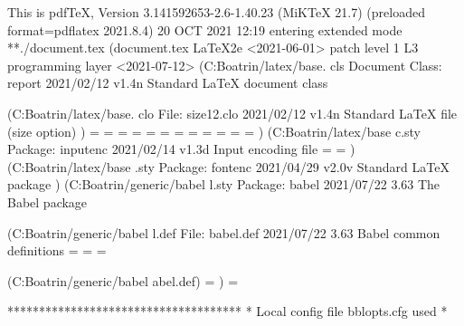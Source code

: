 This is pdfTeX, Version 3.141592653-2.6-1.40.23 (MiKTeX 21.7) (preloaded format=pdflatex 2021.8.4)  20 OCT 2021 12:19
entering extended mode
**./document.tex
(document.tex
LaTeX2e <2021-06-01> patch level 1
L3 programming layer <2021-07-12>
(C:\Users\Landrine Boatrin\AppData\Local\Programs\MiKTeX\tex/latex/base\report.
cls
Document Class: report 2021/02/12 v1.4n Standard LaTeX document class

(C:\Users\Landrine Boatrin\AppData\Local\Programs\MiKTeX\tex/latex/base.
clo
File: size12.clo 2021/02/12 v1.4n Standard LaTeX file (size option)
)
\c@part=
\c@chapter=
\c@section=
\c@subsection=
\c@subsubsection=
\c@paragraph=
\c@subparagraph=
\c@figure=
\c@table=
\abovecaptionskip=
\belowcaptionskip=
\bibindent=
)
(C:\Users\Landrine Boatrin\AppData\Local\Programs\MiKTeX\tex/latex/base
c.sty
Package: inputenc 2021/02/14 v1.3d Input encoding file
\inpenc@prehook=
\inpenc@posthook=
)
(C:\Users\Landrine Boatrin\AppData\Local\Programs\MiKTeX\tex/latex/base\fontenc
.sty
Package: fontenc 2021/04/29 v2.0v Standard LaTeX package
)
(C:\Users\Landrine Boatrin\AppData\Local\Programs\MiKTeX\tex/generic/babel\babe
l.sty
Package: babel 2021/07/22 3.63 The Babel package

(C:\Users\Landrine Boatrin\AppData\Local\Programs\MiKTeX\tex/generic/babel\babe
l.def
File: babel.def 2021/07/22 3.63 Babel common definitions
\babel@savecnt=
\U@D=
\l@unhyphenated=

(C:\Users\Landrine Boatrin\AppData\Local\Programs\MiKTeX\tex/generic/babel\txtb
abel.def)
\bbl@readstream=
)
\bbl@dirlevel=

*************************************
* Local config file bblopts.cfg used
*

